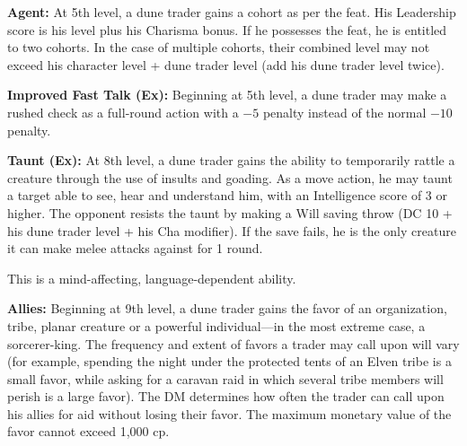 {\textbf{Agent:} At 5th level, a dune trader gains a cohort as per the  feat. His Leadership score is his level plus his Charisma bonus. If he possesses the  feat, he is entitled to two cohorts. In the case of multiple cohorts, their combined level may not exceed his character level + dune trader level (add his dune trader level twice).

\textbf{Improved Fast Talk (Ex):} Beginning at 5th level, a dune trader may make a rushed  check as a full-round action with a $-5$ penalty instead of the normal $-10$ penalty.

\textbf{Taunt (Ex):} At 8th level, a dune trader gains the ability to temporarily rattle a creature through the use of insults and goading. As a move action, he may taunt a target able to see, hear and understand him, with an Intelligence score of 3 or higher. The opponent resists the taunt by making a Will saving throw (DC 10 + his dune trader level + his Cha modifier). If the save fails, he is the only creature it can make melee attacks against for 1 round.

This is a mind-affecting, language-dependent ability.

\textbf{Allies:} Beginning at 9th level, a dune trader gains the favor of an organization, tribe, planar creature or a powerful individual---in the most extreme case, a sorcerer-king. The frequency and extent of favors a trader may call upon will vary (for example, spending the night under the protected tents of an Elven tribe is a small favor, while asking for a caravan raid in which several tribe members will perish is a large favor). The DM determines how often the trader can call upon his allies for aid without losing their favor. The maximum monetary value of the favor cannot exceed 1,000 cp.
}

